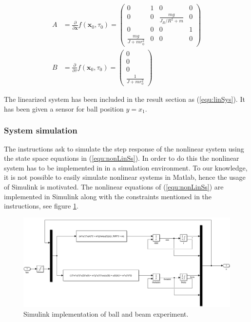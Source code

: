 \documentclass[a4paper, titlepage]{article}
\begin{document}
\begin{equation}
\begin{split}
A &= \frac{\partial}{\partial \textbf{x}}f(\textbf{x}_0, \tau_0) = 
\begin{pmatrix}
0 & 1 & 0 & 0 \\
0 & 0 & \frac{mg}{J_R/R^2 + m} & 0 \\
0 & 0 & 0 & 1 \\
\frac{mg}{J + mr_0^2} & 0 & 0 & 0
\end{pmatrix} \\
B &= \frac{\partial}{\partial \tau}f(\textbf{x}_0, \tau_0) = 
\begin{pmatrix}
0 \\ 0 \\ 0 \\ \frac{1}{J + mr_0^2}
\end{pmatrix}
\end{split}
\end{equation}

The linearized system has been included in the result section as (\ref{equ:linSys}).
It has been given a sensor for ball position $y = x_1$.

\subsubsection{System simulation}
The instructions ask to simulate the step response of the nonlinear system using the state space equations in (\ref{equ:nonLinSs}).
In order to do this the nonlinear system has to be implemented in in a simulation environment.
To our knowledge, it is not possible to easily simulate nonlinear systems in Matlab, hence the usage of Simulink is motivated.
The nonlinear equations of (\ref{equ:nonLinSs}) are implemented in Simulink along with the constraints mentioned in the instructions, see figure \ref{fig:ballBeamSimulink}.

\begin{figure}[h!]
\center
\includegraphics[scale=0.4]{../figures/ballBeamSimulink.png}
\caption{Simulink implementation of ball and beam experiment.}
\label{fig:ballBeamSimulink}
\end{figure}
\end{document}
